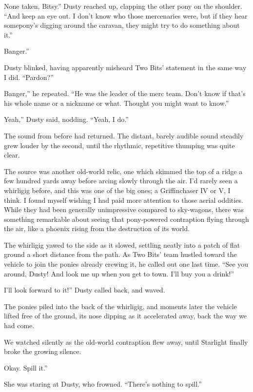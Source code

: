 \leavevmode{}None taken, Bitsy.” Dusty reached up, clapping the other pony on the shoulder. “And keep an eye out. I don’t know who those mercenaries were, but if they hear somepony’s digging around the caravan, they might try to do something about it.”

\leavevmode{}Banger.”

Dusty blinked, having apparently misheard Two Bits’ statement in the same way I did. “Pardon?”

\leavevmode{}Banger,” he repeated. “He was the leader of the merc team. Don’t know if that’s his whole name or a nickname or what. Thought you might want to know.”

\leavevmode{}Yeah,” Dusty said, nodding. “Yeah, I do.”

The sound from before had returned. The distant, barely audible sound steadily grew louder by the second, until the rhythmic, repetitive thumping was quite clear.

The source was another old-world relic, one which skimmed the top of a ridge a few hundred yards away before arcing slowly through the air. I’d rarely seen a whirligig before, and this was one of the big ones; a Griffinchaser IV or V, I think. I found myself wishing I had paid more attention to those aerial oddities. While they had been generally unimpressive compared to sky-wagons, there was something remarkable about seeing that pony-powered contraption flying through the air, like a phoenix rising from the destruction of its world.

The whirligig yawed to the side as it slowed, settling neatly into a patch of flat ground a short distance from the path. As Two Bits’ team hustled toward the vehicle to join the ponies already crewing it, he called out one last time. “See you around, Dusty! And look me up when you get to town. I’ll buy you a drink!”

\leavevmode{}I’ll look forward to it!” Dusty called back, and waved.

The ponies piled into the back of the whirligig, and moments later the vehicle lifted free of the ground, its nose dipping as it accelerated away, back the way we had come.

We watched silently as the old-world contraption flew away, until Starlight finally broke the growing silence.

\leavevmode{}Okay. Spill it.”

She was staring at Dusty, who frowned. “There’s nothing to spill.”

